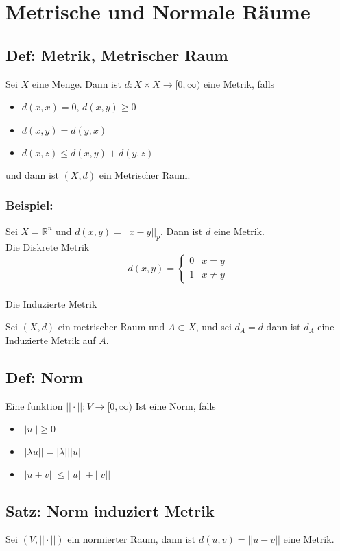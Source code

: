 
\section{Metrische und Normale Räume}

\subsection{Def: Metrik, Metrischer Raum}
Sei $X$ eine Menge. Dann ist $d: X\times X\rightarrow [0,\infty)$ eine Metrik, falls
	\begin{itemize}
		\item $d(x,x) = 0$, $d(x,y)\geq 0$
		\item $d(x,y) = d(y,x)$
		\item $d(x,z) \leq d(x,y) + d(y,z)$
	\end{itemize}
und dann ist $(X,d)$ ein Metrischer Raum.

\subsubsection*{Beispiel:}
Sei $X=\mathbb R^n$ und $d(x,y) = ||x-y||_p$. Dann ist $d$ eine Metrik.
\\
Die Diskrete Metrik
$$
d(x,y) = \begin{cases}
	0 & x=y\\
	1 & x\neq y
\end{cases}
$$
\\
Die Induzierte Metrik

Sei $(X,d)$ ein metrischer Raum und $A\subset X$, und sei $d_A = d$ dann ist $d_A$ eine Induzierte Metrik auf $A$.

\subsection{Def: Norm}
Eine funktion $||\cdot||:V\rightarrow [0,\infty)$ Ist eine Norm, falls
	\begin{itemize}
		\item $||u||\geq 0$
		\item $||\lambda u|| = |\lambda| ||u||$
		\item $||u + v|| \leq ||u|| + ||v||$
	\end{itemize}

\subsection{Satz: Norm induziert Metrik}
Sei $(V,||\cdot||)$ ein normierter Raum, dann ist $d(u,v) = ||u-v||$ eine Metrik.

